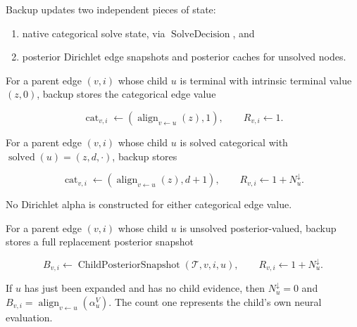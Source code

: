 \documentclass[11pt]{article}
\newcommand{\Tree}{\mathcal{T}}
\newcommand{\Align}{\operatorname{align}}
\newcommand{\Solved}{\operatorname{solved}}
\newcommand{\Cat}{\operatorname{cat}}
\newcommand{\ChildPosteriorSnapshot}{\operatorname{ChildPosteriorSnapshot}}
\newcommand{\SolveDecision}{\operatorname{SolveDecision}}
\begin{document}
Backup updates two independent pieces of state:

\begin{enumerate}[leftmargin=2em]
  \item native categorical solve state, via \(\SolveDecision\), and
  \item posterior Dirichlet edge snapshots and posterior caches for unsolved
  nodes.
\end{enumerate}

For a parent edge \((v,i)\) whose child \(u\) is terminal with intrinsic terminal
value \((z,0)\), backup stores the categorical edge value

\[
\Cat_{v,i}\gets(\Align_{v\leftarrow u}(z),1),
\qquad
R_{v,i}\gets 1.
\]

For a parent edge \((v,i)\) whose child \(u\) is solved categorical with
\(\Solved(u)=(z,d,\cdot)\), backup stores

\[
\Cat_{v,i}\gets(\Align_{v\leftarrow u}(z),d+1),
\qquad
R_{v,i}\gets 1+N^\downarrow_u.
\]

No Dirichlet alpha is constructed for either categorical edge value.

For a parent edge \((v,i)\) whose child \(u\) is unsolved posterior-valued,
backup stores a full replacement posterior snapshot

\[
B_{v,i}\gets\ChildPosteriorSnapshot(\Tree,v,i,u),
\qquad
R_{v,i}\gets 1+N^\downarrow_u.
\]

If \(u\) has just been expanded and has no child evidence, then
\(N^\downarrow_u=0\) and \(B_{v,i}=\Align_{v\leftarrow u}(\alpha_u^V)\). The
count one represents the child's own neural evaluation.
\end{document}
